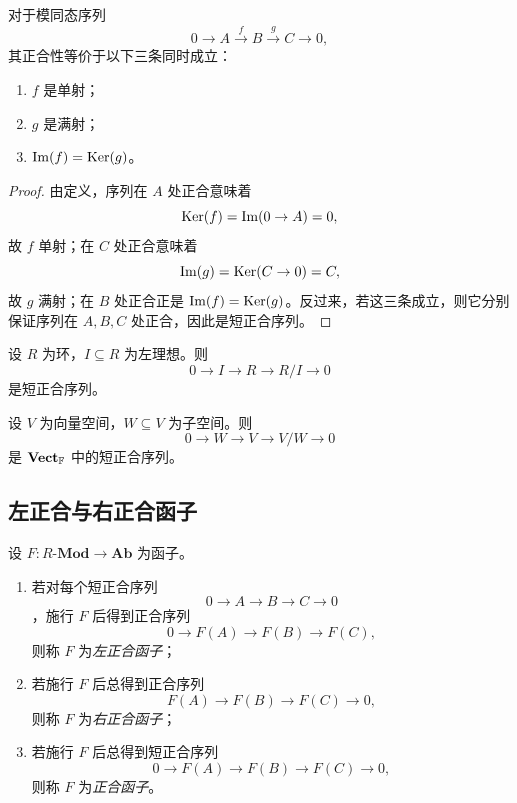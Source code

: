 \begin{proposition}
对于模同态序列
\[
  0\longrightarrow A\xrightarrow{f} B\xrightarrow{g} C\longrightarrow 0,
\]
其正合性等价于以下三条同时成立：
\begin{enumerate}[label=(\arabic*), leftmargin=2.5em]
  \item $f$ 是单射；
  \item $g$ 是满射；
  \item $\mathrm{Im}(f)=\mathrm{Ker}(g)$。
\end{enumerate}
\end{proposition}

\begin{proof}
由定义，序列在 $A$ 处正合意味着
\[
  \mathrm{Ker}(f)=\mathrm{Im}(0\to A)=0,
\]
故 $f$ 单射；在 $C$ 处正合意味着
\[
  \mathrm{Im}(g)=\mathrm{Ker}(C\to 0)=C,
\]
故 $g$ 满射；在 $B$ 处正合正是 $\mathrm{Im}(f)=\mathrm{Ker}(g)$。反过来，若这三条成立，则它分别保证序列在 $A,B,C$ 处正合，因此是短正合序列。
\end{proof}

\begin{example}
设 $R$ 为环，$I\subseteq R$ 为左理想。则
\[
  0\longrightarrow I\longrightarrow R\longrightarrow R/I\longrightarrow 0
\]
是短正合序列。
\end{example}

\begin{example}
设 $V$ 为向量空间，$W\subseteq V$ 为子空间。则
\[
  0\longrightarrow W\longrightarrow V\longrightarrow V/W\longrightarrow 0
\]
是 $\mathbf{Vect}_{\mathbb{F}}$ 中的短正合序列。
\end{example}

\subsection{左正合与右正合函子}

\begin{definition}
设 $F\colon R\text{-}\mathbf{Mod}\to \mathbf{Ab}$ 为函子。
\begin{enumerate}[label=(\arabic*), leftmargin=2.5em]
  \item 若对每个短正合序列
  \[
    0\to A\to B\to C\to 0
  \]
  ，施行 $F$ 后得到正合序列
  \[
    0\to F(A)\to F(B)\to F(C),
  \]
  则称 $F$ 为\emph{左正合函子}；
  \item 若施行 $F$ 后总得到正合序列
  \[
    F(A)\to F(B)\to F(C)\to 0,
  \]
  则称 $F$ 为\emph{右正合函子}；
  \item 若施行 $F$ 后总得到短正合序列
  \[
    0\to F(A)\to F(B)\to F(C)\to 0,
  \]
  则称 $F$ 为\emph{正合函子}。
\end{enumerate}
\end{definition}

